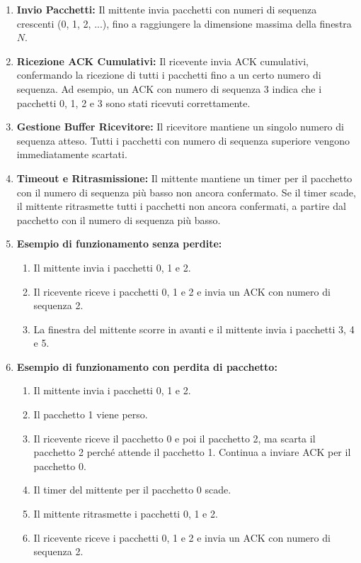 \begin{enumerate}
  \item \textbf{Invio Pacchetti:} Il mittente invia pacchetti con numeri di sequenza crescenti (0, 1, 2, ...), fino a raggiungere la dimensione massima della finestra $N$.
  \item \textbf{Ricezione ACK Cumulativi:} Il ricevente invia ACK cumulativi, confermando la ricezione di tutti i pacchetti fino a un certo numero di sequenza. Ad esempio, un ACK con numero di sequenza 3 indica che i pacchetti 0, 1, 2 e 3 sono stati ricevuti correttamente.
  \item \textbf{Gestione Buffer Ricevitore:} Il ricevitore mantiene un singolo numero di sequenza atteso. Tutti i pacchetti con numero di sequenza superiore vengono immediatamente scartati.
  \item \textbf{Timeout e Ritrasmissione:} Il mittente mantiene un timer per il pacchetto con il numero di sequenza più basso non ancora confermato. Se il timer scade, il mittente ritrasmette tutti i pacchetti non ancora confermati, a partire dal pacchetto con il numero di sequenza più basso.
  \item \textbf{Esempio di funzionamento senza perdite:}
  \begin{enumerate}
    \item Il mittente invia i pacchetti 0, 1 e 2.
    \item Il ricevente riceve i pacchetti 0, 1 e 2 e invia un ACK con numero di sequenza 2.
    \item La finestra del mittente scorre in avanti e il mittente invia i pacchetti 3, 4 e 5.
  \end{enumerate}

  \item \textbf{Esempio di funzionamento con perdita di pacchetto:}
  \begin{enumerate}
    \item Il mittente invia i pacchetti 0, 1 e 2.
    \item Il pacchetto 1 viene perso.
    \item Il ricevente riceve il pacchetto 0 e poi il pacchetto 2, ma scarta il pacchetto 2 perché attende il pacchetto 1. Continua a inviare ACK per il pacchetto 0.
    \item Il timer del mittente per il pacchetto 0 scade.
    \item Il mittente ritrasmette i pacchetti 0, 1 e 2.
    \item Il ricevente riceve i pacchetti 0, 1 e 2 e invia un ACK con numero di sequenza 2.
  \end{enumerate}
\end{enumerate}

